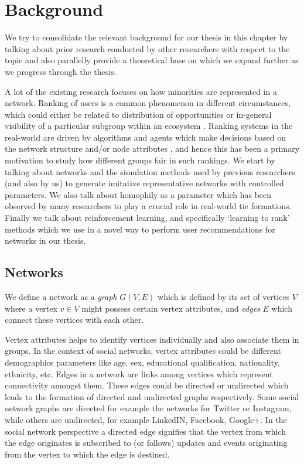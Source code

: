 \chapter{Background}
\label{chapter_background}
\thispagestyle{empty}

We try to consolidate the relevant background for our thesis in this chapter by talking about prior research conducted by other researchers with respect to the topic and also parallelly provide a theoretical base on which we expand further as we progress through the thesis. 

A lot of the existing research focuses on how minorities are represented in a network. Ranking of users is a common phenomenon in different circumstances, which could either be related to distribution of opportunities or in-general visibility of a particular subgroup within an ecosystem \cite{brin1998anatomy,horowitz2010anatomy,chalfin2016productivity}. Ranking systems in the real-world are driven by algorithms and agents which make decisions based on the network structure and/or node attributes \cite{adamic2003friends,gupta2013wtf,backstrom2011supervised}, and hence this has been a primary motivation to study how different groups fair in such rankings. We start by talking about networks and the simulation methods used by previous researchers (and also by us) to generate imitative representative networks with controlled parameters. We also talk about homophily as a parameter which has been observed by many researchers to play a crucial role in real-world tie formations. Finally we talk about reinforcement learning, and specifically `learning to rank' methods which we use in a novel way to perform user recommendations for networks in our thesis.

\section{Networks}
\label{back_networks}
We define a network as a \textit{graph} $G(V,E)$ which is defined by its set of vertices $V$ where a vertex $v \in V$ might possess certain vertex attributes, and \textit{edges} $E$ which connect these vertices with each other. 

Vertex attributes helps to identify vertices individually and also associate them in groups. In the context of social networks, vertex attributes could be different demographics parameters like age, sex, educational qualification, nationality, ethnicity, etc. Edges in a network are links among vertices which represent connectivity amongst them. These edges could be directed or undirected which leads to the formation of directed and undirected graphs respectively. Some social network graphs are directed for example the networks for Twitter or Instagram, while others are undirected, for example LinkedIN, Facebook, Google+. In the social network perspective a directed edge signifies that the vertex from which the edge originates is subscribed to (or follows) updates and events originating from the vertex to which the edge is destined.

